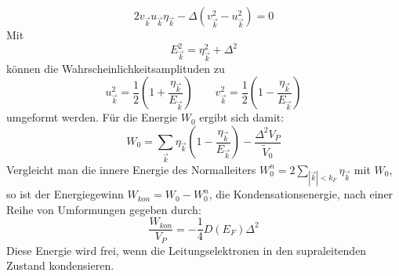 \[
	2 v_{\vec{k}} u_{\vec{k}} \eta_{\vec{k}} - \Delta(v_{\vec{k}}^2 - u_{\vec{k}}^2)
	=0
\]
Mit
\[
	E_{\vec{k}}^2 = \eta_{\vec{k}}^2 + \Delta^2
\]
können die Wahrscheinlichkeitsamplituden zu 
\[
	u_{\vec{k}}^2 = \frac{1}{2} \left( 1 + \frac{ \eta_{\vec{k}} }{E_{\vec{k}}} 
	\right)
	\qquad 
	v_{\vec{k}}^2 = \frac{1}{2} \left( 1 - \frac{ \eta_{\vec{k}} }{E_{\vec{k}}} 
	\right)
\]
umgeformt werden. Für die Energie $W_0$ ergibt sich damit:
\[
	W_0 = \sum_{\vec{k}} \eta_{\vec{k}} \left( 1-\frac{\eta_{\vec{k}}}{E_{\vec{k}}}
		  \right) - \frac{\Delta^2 V_P}{\tilde{V}_0}
\]
Vergleicht man die innere Energie des Normalleiters $W_0^n = 2 \sum_{|\vec{k}| < k_F}
\eta_{\vec{k}}$ mit $W_0$, so ist der Energiegewinn $W_{kon} = W_0 - W_0^n$, die 
Kondensationsenergie, nach einer Reihe von Umformungen gegeben durch:
\[
	\frac{W_{kon}}{V_P} = - \frac{1}{4} D(E_F) \Delta^2
\]
Diese Energie wird frei, wenn die Leitungselektronen in den supraleitenden Zustand
kondensieren.

